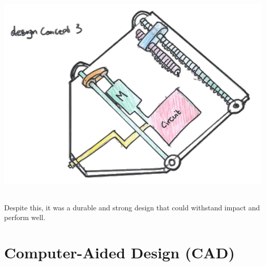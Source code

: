 \documentclass{article}
\begin{document}
\begin{minipage}{0.4\textwidth}
	\centering
	\includegraphics[width=1\textwidth]{images/image_8_2-Photoroom.png}
\end{minipage}\\[8pt]
Despite this, it was a durable and strong design that could withstand impact and perform well.

\newpage
\section{Computer-Aided Design (CAD)}
\end{document}
